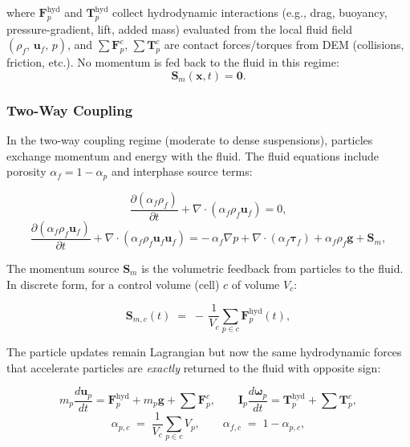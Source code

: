 where $\mathbf{F}^{\text{hyd}}_p$ and $\mathbf{T}^{\text{hyd}}_p$ collect hydrodynamic interactions (e.g., drag, buoyancy, pressure-gradient, lift, added mass) evaluated from the local fluid field $(\rho_f,\,\mathbf{u}_f,\,p)$, and $\sum \mathbf{F}^{c}_p$, $\sum \mathbf{T}^{c}_p$ are contact forces/torques from DEM (collisions, friction, etc.). No momentum is fed back to the fluid in this regime:
\[
\mathbf{S}_m(\mathbf{x},t) = \mathbf{0}.
\]

\subsubsection{Two-Way Coupling}

In the two-way coupling regime (moderate to dense suspensions), particles exchange momentum and energy with the fluid. The fluid equations include porosity $\alpha_f=1-\alpha_p$ and interphase source terms:

\begin{equation}
\frac{\partial (\alpha_f \rho_f)}{\partial t} + \nabla\cdot(\alpha_f \rho_f \mathbf{u}_f) = 0,
\end{equation}
\begin{equation}
\frac{\partial (\alpha_f \rho_f \mathbf{u}_f)}{\partial t}
+ \nabla\cdot(\alpha_f \rho_f \mathbf{u}_f \mathbf{u}_f)
= -\,\alpha_f \nabla p + \nabla\cdot(\alpha_f \boldsymbol{\tau}_f)
+ \alpha_f \rho_f \mathbf{g} + \mathbf{S}_m,
\end{equation}

The momentum source $\mathbf{S}_m$ is the volumetric feedback from particles to the fluid. In discrete form, for a control volume (cell) $c$ of volume $V_c$:

\begin{equation}
\mathbf{S}_{m,c}(t) \;=\; -\,\frac{1}{V_c}\sum_{p \in c} \mathbf{F}^{\text{hyd}}_{p}(t),
\end{equation}

The particle updates remain Lagrangian but now the same hydrodynamic forces that accelerate particles are \emph{exactly} returned to the fluid with opposite sign:

\begin{equation}
m_p \frac{d \mathbf{u}_p}{dt} = \mathbf{F}^{\text{hyd}}_p + m_p \mathbf{g} + \sum \mathbf{F}^{c}_p,
\qquad
\mathbf{I}_p \frac{d \boldsymbol{\omega}_p}{dt} = \mathbf{T}^{\text{hyd}}_p + \sum \mathbf{T}^{c}_p,
\end{equation}
\begin{equation}
\alpha_{p,c} \;=\; \frac{1}{V_c}\sum_{p \in c} V_p, 
\qquad
\alpha_{f,c} \;=\; 1-\alpha_{p,c},
\end{equation}

